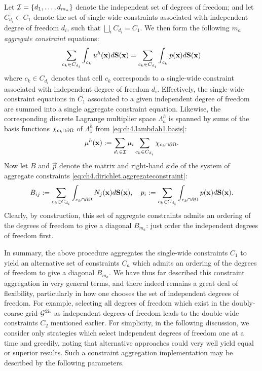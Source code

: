 Let $\mathcal{I} = \left\lbrace  d_1, \dotsc, d_{m_a}  \right\rbrace$ denote the independent set of degrees of freedom; and let $C_{d_i} \subset C_1$ denote the set of single-wide constraints associated with independent degree of freedom $d_i$, such that $\bigsqcup_{i} C_{d_i} = C_1$. We then form the following $m_a$ \emph{aggregate constraint} equations:
\begin{equation} \label{eq:ch4.dirichlet.aggregateconstraint}
\sum_{c_k \in C_{d_i}} \int_{c_k} u^h(\mathbf{x}) d\mathbf{S}(\mathbf{x}) = \sum_{c_k \in C_{d_i}} \int_{c_k} p(\mathbf{x}) d\mathbf{S}(\mathbf{x})
\end{equation}
where $c_k \in C_{d_i}$ denotes that cell $c_k$ corresponds to a single-wide constraint associated with independent degree of freedom $d_i$. Effectively, the single-wide constraint equations in $C_1$ associated to a given independent degree of freedom are summed into a single aggregate constraint equation. Likewise, the corresponding discrete Lagrange multiplier space $\Lambda^h_a$ is spanned by sums of the basis functions $\chi_{c_k \cap \partial\Omega}$ of $\Lambda^h_1$ from \eqref{eq:ch4.lambdah1.basis}:
\begin{equation*}
\mu^h(\mathbf{x}) := \sum_{d_i \in \mathcal{I}} \mu_i \sum_{c_k \in C_{d_i}} \chi_{c_k \cap \partial\Omega}.
\end{equation*}
Now let $B$ and $\vec{p}$ denote the matrix and right-hand side of the system of aggregate constraints \eqref{eq:ch4.dirichlet.aggregateconstraint}:
\begin{equation} \label{eq:ch4.dirichlet.aggregateconstraint.matrix}
B_{ij} := \sum_{c_k \in C_{d_i}} \int_{c_k \cap \partial\Omega} N_j(\mathbf{x}) d\mathbf{S}(\mathbf{x}), \quad p_i := \sum_{c_k \in C_{d_i}} \int_{c_k \cap \partial\Omega} p(\mathbf{x}) d\mathbf{S}(\mathbf{x}).
\end{equation}
Clearly, by construction, this set of aggregate constraints admits an ordering of the degrees of freedom to give a diagonal $B_{m_a}$: just order the independent degrees of freedom first.

In summary, the above procedure aggregates the single-wide constraints $C_1$ to yield an alternative set of constraints $C_a$ which admits an ordering of the degrees of freedom to give a diagonal $B_{m_a}$. We have thus far described this constraint aggregation in very general terms, and there indeed remains a great deal of flexibility, particularly in how one chooses the set of independent degrees of freedom. For example, selecting all degrees of freedom which exist in the doubly-coarse grid $\mathcal{G}^{2h}$ as independent degrees of freedom leads to the double-wide constraints $C_2$ mentioned earlier. For simplicity, in the following discussion, we consider only strategies which select independent degrees of freedom one at a time and greedily, noting that alternative approaches could very well yield equal or superior results. Such a constraint aggregation implementation may be described by the following parameters.

